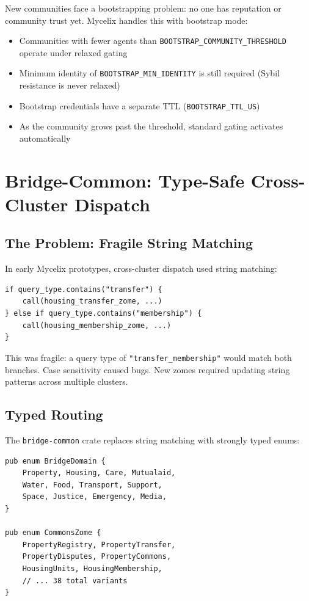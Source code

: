 \documentclass[12pt]{book}
\begin{document}
New communities face a bootstrapping problem: no one has reputation or community
trust yet. Mycelix handles this with bootstrap mode:

\begin{itemize}
  \item Communities with fewer agents than \texttt{BOOTSTRAP\_COMMUNITY\_THRESHOLD}
    operate under relaxed gating
  \item Minimum identity of \texttt{BOOTSTRAP\_MIN\_IDENTITY} is still required
    (Sybil resistance is never relaxed)
  \item Bootstrap credentials have a separate TTL (\texttt{BOOTSTRAP\_TTL\_US})
  \item As the community grows past the threshold, standard gating activates
    automatically
\end{itemize}


\chapter{Bridge-Common: Type-Safe Cross-Cluster Dispatch}

\section{The Problem: Fragile String Matching}

In early Mycelix prototypes, cross-cluster dispatch used string matching:

\begin{lstlisting}
if query_type.contains("transfer") {
    call(housing_transfer_zome, ...)
} else if query_type.contains("membership") {
    call(housing_membership_zome, ...)
}
\end{lstlisting}

This was fragile: a query type of \texttt{"transfer\_membership"} would match
both branches. Case sensitivity caused bugs. New zomes required updating
string patterns across multiple clusters.

\section{Typed Routing}

The \texttt{bridge-common} crate replaces string matching with strongly typed
enums:

\begin{lstlisting}
pub enum BridgeDomain {
    Property, Housing, Care, Mutualaid,
    Water, Food, Transport, Support,
    Space, Justice, Emergency, Media,
}

pub enum CommonsZome {
    PropertyRegistry, PropertyTransfer,
    PropertyDisputes, PropertyCommons,
    HousingUnits, HousingMembership,
    // ... 38 total variants
}
\end{lstlisting}
\end{document}
